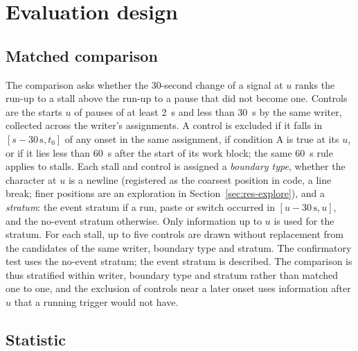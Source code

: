 \section{Evaluation design}
\label{sec:design}

\subsection{Matched comparison}

The comparison asks whether the 30-second change of a signal at $u$ ranks the run-up to a stall above the run-up to a
pause that did not become one. Controls are the starts $u$ of pauses of at least 2~s and less than 30~s by the same
writer, collected across the writer's assignments. A control is excluded if it falls in $[s - 30\,\mathrm{s}, t_0]$ of
any onset in the same assignment, if condition A is true at its $u$, or if it lies less than 60~s after the start of its
work block; the same 60~s rule applies to stalls. Each stall and control is assigned a \emph{boundary type}, whether the
character at $u$ is a newline (registered as the coarsest position in code, a line break; finer positions are an
exploration in Section~\ref{sec:res-explore}), and a \emph{stratum}: the event stratum if a run, paste or switch occurred in
$[u - 30\,\mathrm{s}, u]$, and the no-event stratum otherwise. Only information up to $u$ is used for the stratum. For
each stall, up to five controls are drawn without replacement from the candidates of the same writer, boundary type and
stratum. The confirmatory test uses the no-event stratum; the event stratum is described. The comparison is thus stratified
within writer, boundary type and stratum rather than matched one to one, and the exclusion of controls near a later
onset uses information after $u$ that a running trigger would not have.

\subsection{Statistic}

